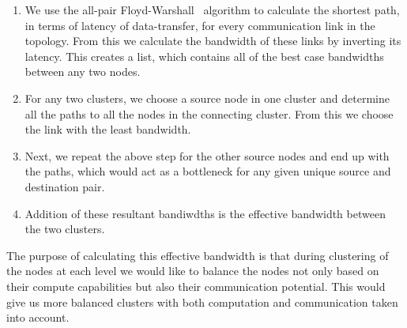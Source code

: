 \begin{itemize}
  \begin{enumerate}

  \item We use the all-pair Floyd-Warshall~\cite{sski08} algorithm to
    calculate the shortest path, in terms of latency of data-transfer,
    for every communication link in the topology. From this we calculate
    the bandwidth of these links by inverting its latency. This creates
    a list, which contains all of the best case bandwidths between any
    two nodes.

  \item For any two clusters, we choose a source node in one cluster and
    determine all the paths to all the nodes in the connecting
    cluster. From this we choose the link with the least bandwidth.

  \item Next, we repeat the above step for the other source nodes and
    end up with the paths, which would act as a bottleneck for any given
    unique source and destination pair.

  \item Addition of these resultant bandiwdths is the effective
    bandwidth between the two clusters.

  \end{enumerate}

  The purpose of calculating this effective bandwidth is that during clustering
  of the nodes at each level we would like to balance the nodes not only based on
  their compute capabilities but also their communication potential. This would
  give us more balanced clusters with both computation and communication taken
  into account.



\end{itemize}
